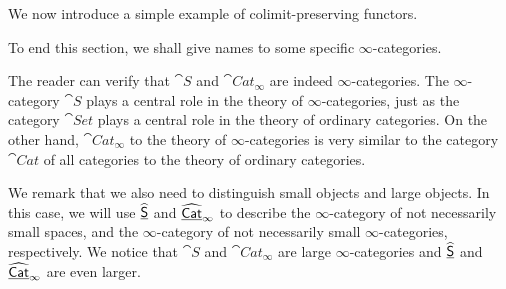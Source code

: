 We now introduce a simple example of colimit-preserving functors.


To end this section, we shall give names to some specific $\infty$-categories.


The reader can verify that $\cat S$ and $\cat{Cat}_\infty$ are indeed $\infty$-categories. The $\infty$-category
$\cat S$ plays a central role in the theory of $\infty$-categories, just as the category $\cat{Set}$ plays a central role 
in the theory of ordinary categories. On the other hand, $\cat{Cat}_\infty$ to the theory of $\infty$-categories is very similar to the category 
$\cat{Cat}$ of all categories to the theory of ordinary categories.

We remark that we also need to distinguish small objects and large objects. In this case, we will use $\underline{\widehat{\mathsf{S}}}$ and
$\underline{\widehat{\mathsf{Cat}}}_\infty$ to describe the $\infty$-category of not necessarily small spaces, and the $\infty$-category 
of not necessarily small $\infty$-categories, respectively. We notice that $\cat S$ and $\cat{Cat}_\infty$ are large
$\infty$-categories and $\underline{\widehat{\mathsf{S}}}$ and $\underline{\widehat{\mathsf{Cat}}}_\infty$ are even larger.